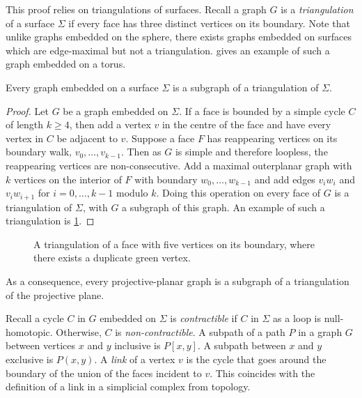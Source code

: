 This proof relies on triangulations of surfaces. Recall a graph $G$ is a \textit{triangulation} of a surface $\Sigma$ if every face has three distinct vertices on its boundary. Note that unlike graphs embedded on the sphere, there exists graphs embedded on surfaces which are edge-maximal but not a triangulation. \textcite{hararyMaximalToroidalGraph1973} gives an example of such a graph embedded on a torus. 

\begin{theorem}\label{thm:triangulation_subgraph}
    Every graph embedded on a surface $\Sigma$ is a subgraph of a triangulation of $\Sigma$.
\end{theorem}

\begin{proof}
    Let $G$ be a graph embedded on $\Sigma$. If a face is bounded by a simple cycle $C$ of length $k \geq 4$, then add a vertex $v$ in the centre of the face and have every vertex in $C$ be adjacent to $v$. Suppose a face $F$ has reappearing vertices on its boundary walk, $v_0, \ldots, v_{k-1}$. Then as $G$ is simple and therefore loopless, the reappearing vertices are non-consecutive. Add a maximal outerplanar graph with $k$ vertices on the interior of $F$ with boundary $w_0, \ldots, w_{k-1}$ and add edges $v_i w_i$ and $v_i w_{i + 1}$ for $i = 0, \ldots, {k-1}$ modulo $k$. Doing this operation on every face of $G$ is a triangulation of $\Sigma$, with $G$ a subgraph of this graph. An example of such a triangulation is \cref{fig:triangulation}.
\end{proof}
\begin{figure}[h!]
    \centering
    
    \caption[Face triangulation]{A triangulation of a face with five vertices on its boundary, where there exists a duplicate green vertex.}\label{fig:triangulation}
\end{figure}
As a consequence, every projective-planar graph is a subgraph of a triangulation of the projective plane. 

Recall a cycle $C$ in $G$ embedded on $\Sigma$ is \textit{contractible} if $C$ in $\Sigma$ as a loop is null-homotopic. Otherwise, $C$ is \textit{ non-contractible}. A subpath of a path $P$ in a graph $G$ between vertices $x$ and $y$ inclusive is $P[x, y]$. A subpath between $x$ and $y$ exclusive is $P(x, y)$. 
A \textit{link} of a vertex $v$ is the cycle that goes around the boundary of the union of the faces incident to $v$. This coincides with the definition of a link in a simplicial complex from topology. 

